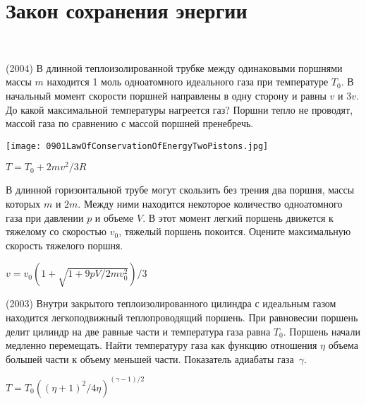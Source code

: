 \section{Закон сохранения энергии}

\begin{ex}
\hspace{0pt} \\
\begin{minipage}{.65\textwidth}
(2004) В длинной теплоизолированной трубке между одинаковыми поршнями массы $m$ находится 1 моль одноатомного идеального газа при температуре $T_0$. 
В начальный момент скорости поршней направлены в одну сторону и равны $v$ и $3v$. До какой максимальной температуры нагреется газ? 
Поршни тепло не проводят, массой газа по сравнению с массой поршней пренебречь.
\end{minipage}
\begin{minipage}{.35\textwidth}
\centering
\texttt{[image: 0901LawOfConservationOfEnergyTwoPistons.jpg]}
\end{minipage}
\begin{ans}
$T=T_0+2mv^2/3R$
\end{ans}
\end{ex}

\begin{ex}
В длинной горизонтальной трубе могут скользить без трения два поршня, массы которых $m$ и $2m$. 
Между ними находится некоторое количество одноатомного газа при давлении $p$ и объеме $V$. 
В этот момент легкий поршень движется к тяжелому со скоростью $v_0$, тяжелый поршень покоится. 
Оцените максимальную скорость тяжелого поршня.
\begin{ans}
$v = v_0\left( 1 + \sqrt{1+9pV/2mv_0^2} \right)/3$
\end{ans}
\end{ex}

\begin{ex}
(2003) Внутри закрытого теплоизолированного цилиндра с идеальным газом находится легкоподвижный теплопроводящий поршень. 
При равновесии поршень делит цилиндр на две равные части и температура газа равна $T_0$. Поршень начали медленно перемещать. 
Найти температуру газа как функцию отношения $\eta$ объема большей части к объему меньшей части. Показатель адиабаты газа~$\gamma$.
\begin{ans}
$T=T_0 \left( (\eta + 1)^2/4 \eta \right)^{(\gamma-1)/2}$
\end{ans}
\end{ex}

